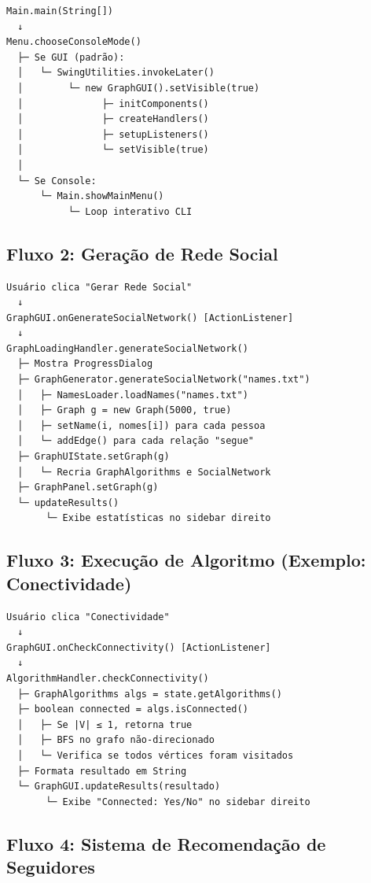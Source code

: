 \documentclass[12pt,a4paper]{article}
\begin{document}
    \begin{verbatim}
Main.main(String[])
  ↓
Menu.chooseConsoleMode()
  ├─ Se GUI (padrão):
  │   └─ SwingUtilities.invokeLater()
  │        └─ new GraphGUI().setVisible(true)
  │              ├─ initComponents()
  │              ├─ createHandlers()
  │              ├─ setupListeners()
  │              └─ setVisible(true)
  │
  └─ Se Console:
      └─ Main.showMainMenu()
           └─ Loop interativo CLI
    \end{verbatim}

    \subsection{Fluxo 2: Geração de Rede Social}

    \begin{verbatim}
Usuário clica "Gerar Rede Social"
  ↓
GraphGUI.onGenerateSocialNetwork() [ActionListener]
  ↓
GraphLoadingHandler.generateSocialNetwork()
  ├─ Mostra ProgressDialog
  ├─ GraphGenerator.generateSocialNetwork("names.txt")
  │   ├─ NamesLoader.loadNames("names.txt")
  │   ├─ Graph g = new Graph(5000, true)
  │   ├─ setName(i, nomes[i]) para cada pessoa
  │   └─ addEdge() para cada relação "segue"
  ├─ GraphUIState.setGraph(g)
  │   └─ Recria GraphAlgorithms e SocialNetwork
  ├─ GraphPanel.setGraph(g)
  └─ updateResults()
       └─ Exibe estatísticas no sidebar direito
    \end{verbatim}

    \subsection{Fluxo 3: Execução de Algoritmo (Exemplo: Conectividade)}

    \begin{verbatim}
Usuário clica "Conectividade"
  ↓
GraphGUI.onCheckConnectivity() [ActionListener]
  ↓
AlgorithmHandler.checkConnectivity()
  ├─ GraphAlgorithms algs = state.getAlgorithms()
  ├─ boolean connected = algs.isConnected()
  │   ├─ Se |V| ≤ 1, retorna true
  │   ├─ BFS no grafo não-direcionado
  │   └─ Verifica se todos vértices foram visitados
  ├─ Formata resultado em String
  └─ GraphGUI.updateResults(resultado)
       └─ Exibe "Connected: Yes/No" no sidebar direito
    \end{verbatim}

    \subsection{Fluxo 4: Sistema de Recomendação de Seguidores}
\end{document}
